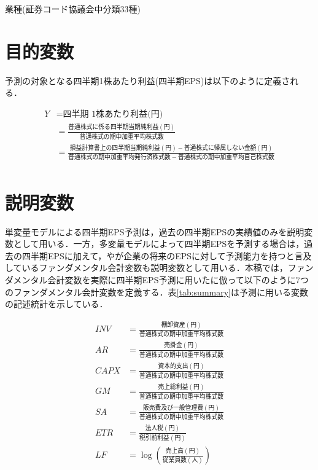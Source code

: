 \documentclass[a4paper，11pt]{jsarticle}
\begin{document}
\begin{table}[bp]
  \centering
  \caption{業種(証券コード協議会中分類33種)}
  \label{tab:ind}
  \small
  
\end{table}

\section{目的変数}

予測の対象となる四半期1株あたり利益(四半期EPS)は以下のように定義される．

\begin{equation}
  \begin{split}
    Y &= \text{四半期 1株あたり利益(円)} \\
    &= \frac{普通株式に係る四半期当期純利益(円)}{普通株式の期中加重平均株式数} \\
    &= \frac{損益計算書上の四半期当期純利益(円)-普通株式に帰属しない金額(円)}{普通株式の期中加重平均発行済株式数 - 普通株式の期中加重平均自己株式数} \\  
  \end{split}
\end{equation}

\section{説明変数}

単変量モデルによる四半期EPS予測は，過去の四半期EPSの実績値のみを説明変数として用いる．一方，多変量モデルによって四半期EPSを予測する場合は，過去の四半期EPSに加えて，\cite{lev1993fundamental}や\cite{abarbanell1997fundamental}が企業の将来のEPSに対して予測能力を持つと言及しているファンダメンタル会計変数も説明変数として用いる．本稿では，ファンダメンタル会計変数を実際に四半期EPS予測に用いた\cite{zhang2004neural}に倣って以下のように7つのファンダメンタル会計変数を定義する．表\ref{tab:summary}は予測に用いる変数の記述統計を示している．

\begin{equation}
  \begin{split}
    INV &= \frac{棚卸資産(円)}{普通株式の期中加重平均株式数} \\
    AR &= \frac{売掛金(円)}{普通株式の期中加重平均株式数} \\
    CAPX &= \frac{資本的支出(円)}{普通株式の期中加重平均株式数} \\
    GM &= \frac{売上総利益(円)}{普通株式の期中加重平均株式数} \\
    SA &= \frac{販売費及び一般管理費(円)}{普通株式の期中加重平均株式数} \\
    ETR &= \frac{法人税(円)}{税引前利益(円)} \\
    LF &= \log{\left(\frac{売上高(円)}{従業員数(人)}\right)} \\
  \end{split}
\end{equation}
\end{document}
